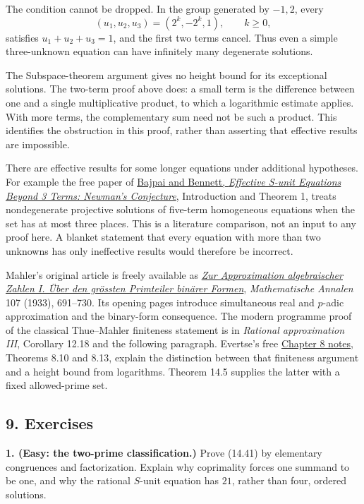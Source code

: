 \documentclass[
  11pt,
  a4paper,
]{article}
\begin{document}
The condition cannot be dropped. In the group generated by \(-1,2\),
every \[
(u_1,u_2,u_3)=(2^k,-2^k,1),\qquad k\ge0,
\tag{14.45}
\] satisfies \(u_1+u_2+u_3=1\), and the first two terms cancel. Thus
even a simple three-unknown equation can have infinitely many degenerate
solutions.

The Subspace-theorem argument gives no height bound for its exceptional
solutions. The two-term proof above does: a small term is the difference
between one and a single multiplicative product, to which a logarithmic
estimate applies. With more terms, the complementary sum need not be
such a product. This identifies the obstruction in this proof, rather
than asserting that effective results are impossible.

There are effective results for some longer equations under additional
hypotheses. For example the free paper of
\href{https://arxiv.org/abs/2308.05162}{Bajpai and Bennett,
\emph{Effective S-unit Equations Beyond 3 Terms: Newman's Conjecture}},
Introduction and Theorem 1, treats nondegenerate projective solutions of
five-term homogeneous equations when the set has at most three places.
This is a literature comparison, not an input to any proof here. A
blanket statement that every equation with more than two unknowns has
only ineffective results would therefore be incorrect.

Mahler's original article is freely available as
\href{https://carmamaths.org/resources/mahler/docs/017.pdf}{\emph{Zur
Approximation algebraischer Zahlen I. Über den grössten Primteiler
binärer Formen}}, \emph{Mathematische Annalen} 107 (1933), 691--730. Its
opening pages introduce simultaneous real and \(p\)-adic approximation
and the binary-form consequence. The modern programme proof of the
classical Thue--Mahler finiteness statement is in \emph{Rational
approximation III}, Corollary 12.18 and the following paragraph.
Evertse's free
\href{https://pub.math.leidenuniv.nl/~evertsejh/dio19-8.pdf}{Chapter 8
notes}, Theorems 8.10 and 8.13, explain the distinction between that
finiteness argument and a height bound from logarithms. Theorem 14.5
supplies the latter with a fixed allowed-prime set.

\subsection{9. Exercises}\label{exercises}

\textbf{1. (Easy: the two-prime classification.)} Prove (14.41) by
elementary congruences and factorization. Explain why coprimality forces
one summand to be one, and why the rational \(S\)-unit equation has
\(21\), rather than four, ordered solutions.
\end{document}
